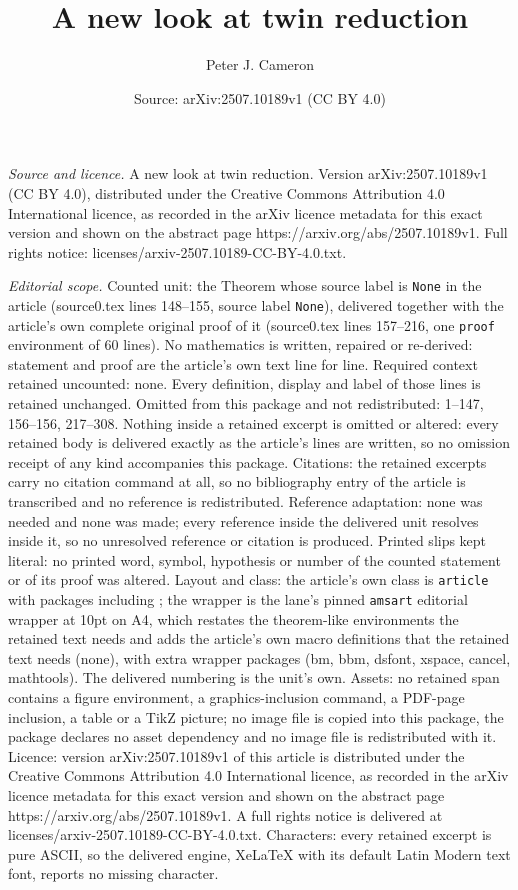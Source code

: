 \documentclass[10pt,a4paper]{amsart}
\title[A new look at twin reduction]{A new look at twin reduction}
\author{Peter J. Cameron}
\date{Source: arXiv:2507.10189v1 (CC BY 4.0)}
\begin{document}
\maketitle

\noindent\emph{Source and licence.} A new look at twin reduction. Version arXiv:2507.10189v1 (CC BY 4.0), distributed under the Creative Commons Attribution 4.0 International licence, as recorded in the arXiv licence metadata for this exact version and shown on the abstract page https://arxiv.org/abs/2507.10189v1. Full rights notice: licenses/arxiv-2507.10189-CC-BY-4.0.txt.\par\smallskip

\noindent\textit{Editorial scope.} Counted unit: the Theorem whose source label is \texttt{None} in the article (source0.tex lines 148--155, source label \texttt{None}), delivered together with the article's own complete original proof of it (source0.tex lines 157--216, one \texttt{proof} environment of 60 lines). No mathematics is written, repaired or re-derived: statement and proof are the article's own text line for line. Required context retained uncounted: none. Every definition, display and label of those lines is retained unchanged. Omitted from this package and not redistributed: 1--147, 156--156, 217--308. Nothing inside a retained excerpt is omitted or altered: every retained body is delivered exactly as the article's lines are written, so no omission receipt of any kind accompanies this package. Citations: the retained excerpts carry no citation command at all, so no bibliography entry of the article is transcribed and no reference is redistributed. Reference adaptation: none was needed and none was made; every reference inside the delivered unit resolves inside it, so no unresolved reference or citation is produced. Printed slips kept literal: no printed word, symbol, hypothesis or number of the counted statement or of its proof was altered. Layout and class: the article's own class is \texttt{article} with packages including ; the wrapper is the lane's pinned \texttt{amsart} editorial wrapper at 10pt on A4, which restates the theorem-like environments the retained text needs and adds the article's own macro definitions that the retained text needs (none), with extra wrapper packages (bm, bbm, dsfont, xspace, cancel, mathtools). The delivered numbering is the unit's own. Assets: no retained span contains a figure environment, a graphics-inclusion command, a PDF-page inclusion, a table or a TikZ picture; no image file is copied into this package, the package declares no asset dependency and no image file is redistributed with it. Licence: version arXiv:2507.10189v1 of this article is distributed under the Creative Commons Attribution 4.0 International licence, as recorded in the arXiv licence metadata for this exact version and shown on the abstract page https://arxiv.org/abs/2507.10189v1. A full rights notice is delivered at licenses/arxiv-2507.10189-CC-BY-4.0.txt. Characters: every retained excerpt is pure ASCII, so the delivered engine, XeLaTeX with its default Latin Modern text font, reports no missing character.
\end{document}
